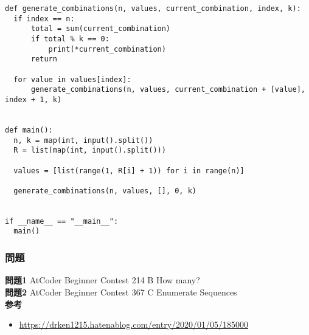 \documentclass{jlreq}
\begin{document}
\begin{lstlisting}[caption=再帰関数を使った解法, label=recursive_ans, frame=TRBL]
def generate_combinations(n, values, current_combination, index, k):
  if index == n:
      total = sum(current_combination)
      if total % k == 0:
          print(*current_combination)
      return

  for value in values[index]:
      generate_combinations(n, values, current_combination + [value], index + 1, k)


def main():
  n, k = map(int, input().split())
  R = list(map(int, input().split()))

  values = [list(range(1, R[i] + 1)) for i in range(n)]

  generate_combinations(n, values, [], 0, k)


if __name__ == "__main__":
  main()
\end{lstlisting}

\subsubsection{問題}

\textbf{問題1} AtCoder Beginner Contest 214 B How many?\\
\textbf{問題2}  AtCoder Beginner Contest 367 C Enumerate Sequences \\


\textbf{参考}
\begin{itemize}
  \item \url{https://drken1215.hatenablog.com/entry/2020/01/05/185000}
\end{itemize}
\end{document}

